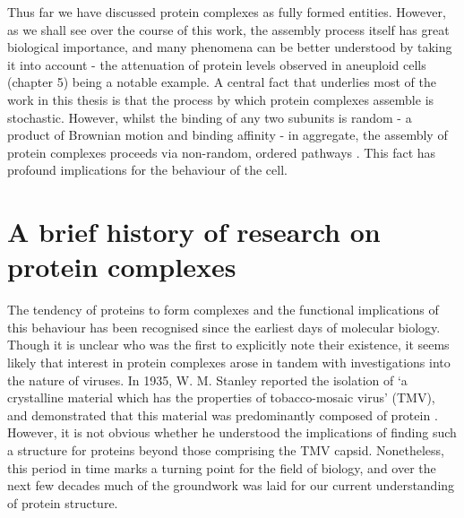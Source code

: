 \documentclass[a4paper,11pt,twoside,openright]{scrbook}
\begin{document}
Thus far we have discussed protein complexes as fully formed entities. However, as we shall see over the course of this work, the assembly process itself has great biological importance, and many phenomena can be better understood by taking it into account - the attenuation of protein levels observed in aneuploid cells (chapter 5) being a notable example. A central fact that underlies most of the work in this thesis is that the process by which protein complexes assemble is stochastic. However, whilst the binding of any two subunits is random - a product of Brownian motion and binding affinity - in aggregate, the assembly of protein complexes proceeds via non-random, ordered pathways \cite{Levy2008, Marsh2013}. This fact has profound implications for the behaviour of the cell.


\section{A brief history of research on protein complexes}
The tendency of proteins to form complexes and the functional implications of this behaviour has been recognised since the earliest days of molecular biology. Though it is unclear who was the first to explicitly note their existence, it seems likely that interest in protein complexes arose in tandem with investigations into the nature of viruses. In 1935, W. M. Stanley reported the isolation of `a crystalline material which has the properties of tobacco-mosaic virus' (TMV), and demonstrated that this material was predominantly composed of protein \cite{Stanley1935}. However, it is not obvious whether he understood the implications of finding such a structure for proteins beyond those comprising the TMV capsid. Nonetheless, this period in time marks a turning point for the field of biology, and over the next few decades much of the groundwork was laid for our current understanding of protein structure.
\end{document}
